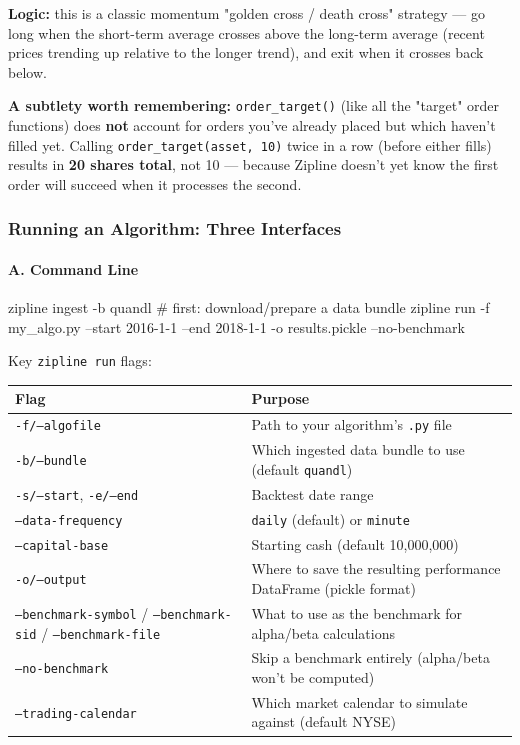 \documentclass[12pt,openany]{book}
\theoremstyle{definition}
\theoremstyle{remark}
\begin{document}
\textbf{Logic:} this is a classic momentum "golden cross / death cross" strategy — go long when the short-term average crosses above the long-term average (recent prices trending up relative to the longer trend), and exit when it crosses back below.

\textbf{A subtlety worth remembering:} \texttt{order\_target()} (like all the "target" order functions) does \textbf{not} account for orders you've already placed but which haven't filled yet. Calling \texttt{order\_target(asset, 10)} twice in a row (before either fills) results in \textbf{20 shares total}, not 10 — because Zipline doesn't yet know the first order will succeed when it processes the second.
\subsubsection{Running an Algorithm: Three Interfaces}

\paragraph{A. Command Line}

\begin{python}
zipline ingest -b quandl      # first: download/prepare a data bundle
zipline run -f my_algo.py --start 2016-1-1 --end 2018-1-1 -o results.pickle --no-benchmark
\end{python}

Key \texttt{zipline run} flags:

\begin{longtable}{@{}L{0.46\textwidth}L{0.46\textwidth}@{}}
\toprule
\textbf{Flag} & \textbf{Purpose} \\
\midrule
\texttt{-f/--algofile} & Path to your algorithm's \texttt{.py} file \\
\texttt{-b/--bundle} & Which ingested data bundle to use (default \texttt{quandl}) \\
\texttt{-s/--start}, \texttt{-e/--end} & Backtest date range \\
\texttt{--data-frequency} & \texttt{daily} (default) or \texttt{minute} \\
\texttt{--capital-base} & Starting cash (default 10,000,000) \\
\texttt{-o/--output} & Where to save the resulting performance DataFrame (pickle format) \\
\texttt{--benchmark-symbol} / \texttt{--benchmark-sid} / \texttt{--benchmark-file} & What to use as the benchmark for alpha/beta calculations \\
\texttt{--no-benchmark} & Skip a benchmark entirely (alpha/beta won't be computed) \\
\texttt{--trading-calendar} & Which market calendar to simulate against (default NYSE) \\
\bottomrule
\end{longtable}
\end{document}
